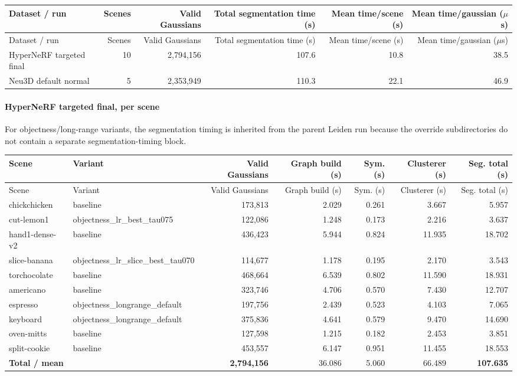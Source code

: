 \documentclass[10pt]{article}
\begin{document}
\small
\begin{longtable}{lrrrrr}
\toprule
Dataset / run & Scenes & Valid Gaussians & Total segmentation time (s) & Mean time/scene (s) & Mean time/gaussian (\(\mu\)s) \\
\midrule
\endfirsthead
\toprule
Dataset / run & Scenes & Valid Gaussians & Total segmentation time (s) & Mean time/scene (s) & Mean time/gaussian (\(\mu\)s) \\
\midrule
\endhead
HyperNeRF targeted final & 10 & 2,794,156 & 107.6 & 10.8 & 38.5 \\
Neu3D default normal & 5 & 2,353,949 & 110.3 & 22.1 & 46.9 \\
\bottomrule
\end{longtable}
\normalsize

\paragraph{HyperNeRF targeted final, per scene}
For objectness/long-range variants, the segmentation timing is inherited from the parent Leiden run because the override subdirectories do not contain a separate segmentation-timing block.

\small
\begin{longtable}{lp{4.5cm}rrrrr}
\toprule
Scene & Variant & Valid Gaussians & Graph build (s) & Sym. (s) & Clusterer (s) & Seg. total (s) \\
\midrule
\endfirsthead
\toprule
Scene & Variant & Valid Gaussians & Graph build (s) & Sym. (s) & Clusterer (s) & Seg. total (s) \\
\midrule
\endhead
chickchicken & baseline & 173,813 & 2.029 & 0.261 & 3.667 & 5.957 \\
cut-lemon1 & objectness\_lr\_best\_tau075 & 122,086 & 1.248 & 0.173 & 2.216 & 3.637 \\
hand1-dense-v2 & baseline & 436,423 & 5.944 & 0.824 & 11.935 & 18.702 \\
slice-banana & objectness\_lr\_slice\_best\_tau070 & 114,677 & 1.178 & 0.195 & 2.170 & 3.543 \\
torchocolate & baseline & 468,664 & 6.539 & 0.802 & 11.590 & 18.931 \\
americano & baseline & 323,746 & 4.706 & 0.570 & 7.430 & 12.707 \\
espresso & objectness\_longrange\_default & 197,756 & 2.439 & 0.523 & 4.103 & 7.065 \\
keyboard & objectness\_longrange\_default & 375,836 & 4.641 & 0.579 & 9.470 & 14.690 \\
oven-mitts & baseline & 127,598 & 1.215 & 0.182 & 2.453 & 3.851 \\
split-cookie & baseline & 453,557 & 6.147 & 0.951 & 11.455 & 18.553 \\
\midrule
\textbf{Total / mean} &  & \textbf{2,794,156} & 36.086 & 5.060 & 66.489 & \textbf{107.635} \\
\bottomrule
\end{longtable}
\normalsize
\end{document}
